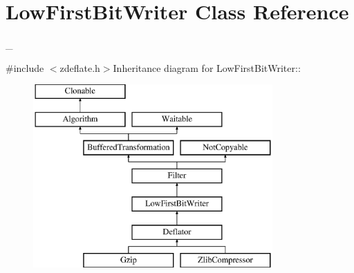\hypertarget{class_low_first_bit_writer}{
\section{LowFirstBitWriter Class Reference}
\label{class_low_first_bit_writer}
}


\_\-  


{\ttfamily \#include $<$zdeflate.h$>$}Inheritance diagram for LowFirstBitWriter::\begin{figure}[H]
\begin{center}
\leavevmode
\includegraphics[height=7cm]{class_low_first_bit_writer}
\end{center}
\end{figure}
